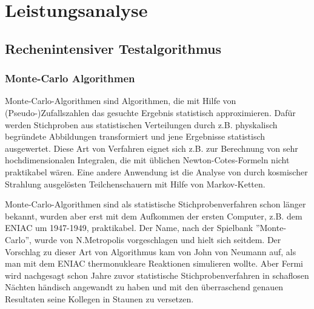 \chapter{Leistungsanalyse}
\label{sct:benchmarks}

\section{Rechenintensiver Testalgorithmus}
\label{sct:montecarloalgo}

\subsection{Monte-Carlo Algorithmen}

Monte-Carlo-Algorithmen sind Algorithmen, die mit Hilfe von (Pseudo-)Zufallszahlen das gesuchte Ergebnis statistisch approximieren. Dafür werden Stichproben aus statistischen Verteilungen durch z.B. physkalisch begründete Abbildungen transformiert und jene Ergebnisse statistisch ausgewertet. Diese Art von Verfahren eignet sich z.B. zur Berechnung von sehr hochdimensionalen Integralen, die mit üblichen Newton-Cotes-Formeln nicht praktikabel wären. Eine andere Anwendung ist die Analyse von durch kosmischer Strahlung ausgelösten Teilchenschauern mit Hilfe von Markov-Ketten\cite{metropolis1949monte}.

Monte-Carlo-Algorithmen sind als statistische Stichprobenverfahren schon länger bekannt, wurden aber erst mit dem Aufkommen der ersten Computer, z.B. dem ENIAC um 1947-1949, praktikabel\cite{metropolis1987beginning}. Der Name, nach der Spielbank ''Monte-Carlo'', wurde von N.Metropolis vorgeschlagen und hielt sich seitdem. Der Vorschlag zu dieser Art von Algorithmus kam von John von Neumann auf, als man mit dem ENIAC thermonukleare Reaktionen simulieren wollte. Aber Fermi wird nachgesagt schon Jahre zuvor statistische Stichprobenverfahren in schaflosen Nächten händisch angewandt zu haben und mit den überraschend genauen Resultaten seine Kollegen in Staunen zu versetzen.


